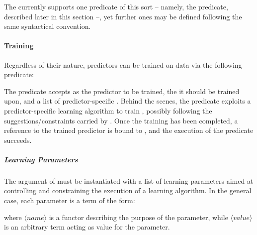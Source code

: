 \documentclass[12pt,a4paper,openright,twoside]{book}
\begin{document}
The \mllib{} currently supports one predicate of this sort -- namely, the  predicate, described later in this section --, yet further ones may be defined following the same syntactical convention.

\paragraph{Training}

Regardless of their nature, predictors can be trained on data via the following predicate:
%
\begin{center}
\end{center}
%
The predicate accepts  as the predictor to be trained, the  it should be trained upon, and a list of predictor-specific .
%
Behind the scenes, the predicate exploits a predictor-specific learning algorithm to train , possibly following the suggestions/constraints carried by .
%
Once the training has been completed, a reference to the trained predictor is bound to , and the execution of the predicate succeeds.

\subparagraph{Learning Parameters}

The  argument of  must be instantiated with a list of learning parameters aimed at controlling and constraining the execution of a learning algorithm.
%
In the general case, each parameter is a term of the form:
%
\begin{center}
\end{center}
%
where $\langle \mathit{name} \rangle$ is a functor describing the purpose of the parameter, while $\langle \mathit{value} \rangle$ is an arbitrary term acting as value for the parameter.
\end{document}
